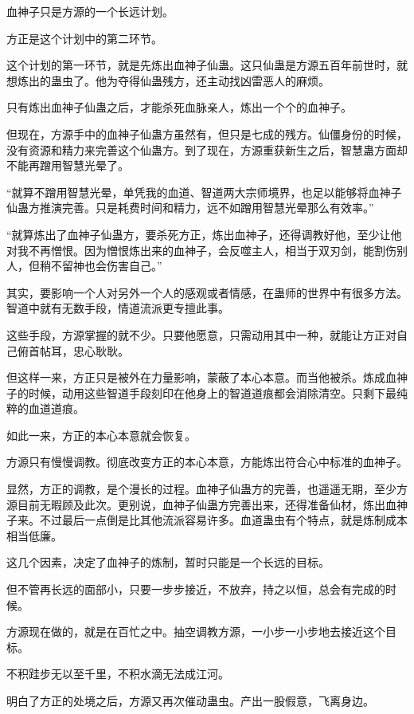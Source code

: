
\begin{this_body}

血神子只是方源的一个长远计划。

方正是这个计划中的第二环节。

这个计划的第一环节，就是先炼出血神子仙蛊。这只仙蛊是方源五百年前世时，就想炼出的蛊虫了。他为夺得仙蛊残方，还主动找凶雷恶人的麻烦。

只有炼出血神子仙蛊之后，才能杀死血脉亲人，炼出一个个的血神子。

但现在，方源手中的血神子仙蛊方虽然有，但只是七成的残方。仙僵身份的时候，没有资源和精力来完善这个仙蛊方。到了现在，方源重获新生之后，智慧蛊方面却不能再蹭用智慧光晕了。

“就算不蹭用智慧光晕，单凭我的血道、智道两大宗师境界，也足以能够将血神子仙蛊方推演完善。只是耗费时间和精力，远不如蹭用智慧光晕那么有效率。”

“就算炼出了血神子仙蛊方，要杀死方正，炼出血神子，还得调教好他，至少让他对我不再憎恨。因为憎恨炼出来的血神子，会反噬主人，相当于双刃剑，能割伤别人，但稍不留神也会伤害自己。”

其实，要影响一个人对另外一个人的感观或者情感，在蛊师的世界中有很多方法。智道中就有无数手段，情道流派更专擅此事。

这些手段，方源掌握的就不少。只要他愿意，只需动用其中一种，就能让方正对自己俯首帖耳，忠心耿耿。

但这样一来，方正只是被外在力量影响，蒙蔽了本心本意。而当他被杀。炼成血神子的时候，动用这些智道手段刻印在他身上的智道道痕都会消除清空。只剩下最纯粹的血道道痕。

如此一来，方正的本心本意就会恢复。

方源只有慢慢调教。彻底改变方正的本心本意，方能炼出符合心中标准的血神子。

显然，方正的调教，是个漫长的过程。血神子仙蛊方的完善，也遥遥无期，至少方源目前无暇顾及此次。更别说，血神子仙蛊方完善出来，还得准备仙材，炼出血神子来。不过最后一点倒是比其他流派容易许多。血道蛊虫有个特点，就是炼制成本相当低廉。

这几个因素，决定了血神子的炼制，暂时只能是一个长远的目标。

但不管再长远的面部小，只要一步步接近，不放弃，持之以恒，总会有完成的时候。

方源现在做的，就是在百忙之中。抽空调教方源，一小步一小步地去接近这个目标。

不积跬步无以至千里，不积水滴无法成江河。

明白了方正的处境之后，方源又再次催动蛊虫。产出一股假意，飞离身边。


\end{this_body}
